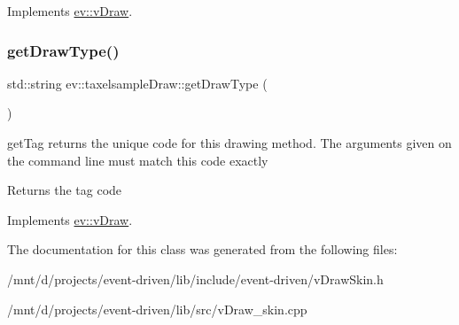 Implements \hyperlink{classev_1_1vDraw_af1eee5dcdf3b4cfee6a3024e5cd706f8}{ev\+::v\+Draw}.

\mbox{\label{classev_1_1taxelsampleDraw_a7bf19e7de1e4851b5567308e95334942}} 
\subsubsection{\texorpdfstring{get\+Draw\+Type()}{getDrawType()}}
{\footnotesize\ttfamily std\+::string ev\+::taxelsample\+Draw\+::get\+Draw\+Type (\begin{DoxyParamCaption}{ }\end{DoxyParamCaption})\hspace{0.3cm}{\ttfamily [virtual]}}



get\+Tag returns the unique code for this drawing method. The arguments given on the command line must match this code exactly 

\begin{DoxyReturn}{Returns}
the tag code 
\end{DoxyReturn}


Implements \hyperlink{classev_1_1vDraw_ac01381befeffef2b930cbceb28b18a28}{ev\+::v\+Draw}.



The documentation for this class was generated from the following files\+:\begin{DoxyCompactItemize}
\item 
/mnt/d/projects/event-\/driven/lib/include/event-\/driven/v\+Draw\+Skin.\+h\item 
/mnt/d/projects/event-\/driven/lib/src/v\+Draw\+\_\+skin.\+cpp\end{DoxyCompactItemize}
